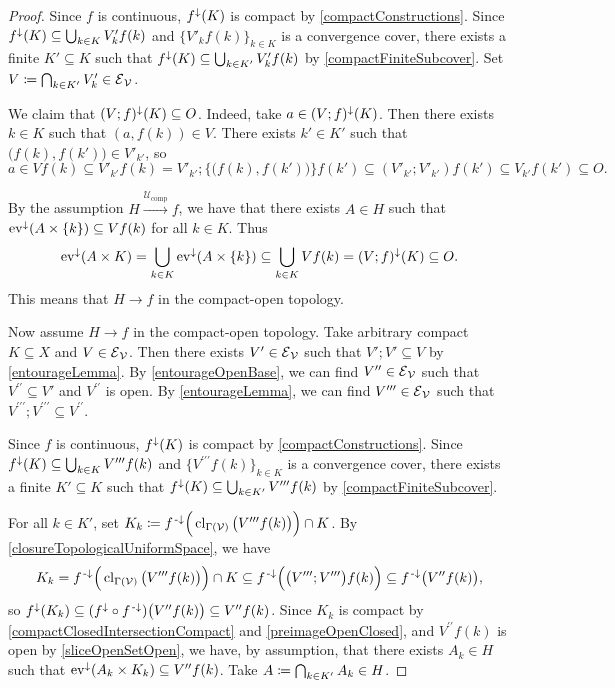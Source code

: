 \begin{proof}
Since $f$ is continuous, $f^\downarrow(K)$ is compact by \ref{compactConstructions}. Since $f^\downarrow(K) \subseteq \bigcup_{k\in K}V'_kf(k)$ and $\{V'_kf(k)\}_{k\in K}$ is a convergence cover, there exists a finite $K'\subseteq K$ such that $f^\downarrow(K)\subseteq \bigcup_{k\in K'}V'_kf(k)$ by \ref{compactFiniteSubcover}. Set $V\coloneqq \bigcap_{k\in K'}V'_k \in \operatorname{\mathcal{E}}_{\mathcal{V}}$.

We claim that $(V;f)^\downarrow(K) \subseteq O$. Indeed, take $a\in (V;f)^\downarrow(K)$. Then there exists $k\in K$ such that $(a, f(k))\in V$. There exists $k'\in K'$ such that $\big(f(k), f(k')\big)\in V'_{k'}$, so
\[ a \in Vf(k) \subseteq V'_{k'}f(k) = V'_{k'};\{\big(f(k), f(k')\big)\}f(k') \subseteq (V'_{k'};V'_{k'})f(k') \subseteq V_{k'}f(k')\subseteq O. \]

By the assumption $H \overset{\mathcal{U}_\text{comp}}{\longrightarrow} f$, we have that there exists $A\in H$ such that $\operatorname{ev}^\downarrow(A\times \{k\}) \subseteq Vf(k)$ for all $k\in K$. Thus
\[ \operatorname{ev}^\downarrow(A\times K) = \bigcup_{k\in K}\operatorname{ev}^\downarrow(A\times \{k\}) \subseteq \bigcup_{k\in K}Vf(k) = (V;f)^\downarrow(K) \subseteq O. \]
This means that $H\to f$ in the compact-open topology.

Now assume $H\to f$ in the compact-open topology. Take arbitrary compact $K\subseteq X$ and $V\in \operatorname{\mathcal{E}}_{\mathcal{V}}$. Then there exists $V'\in \operatorname{\mathcal{E}}_{\mathcal{V}}$ such that $V';V' \subseteq V$ by \ref{entourageLemma}. By \ref{entourageOpenBase}, we can find $V^{\prime\prime} \in \operatorname{\mathcal{E}}_\mathcal{V}$ such that $V^{\prime\prime} \subseteq V'$ and $V^{\prime\prime}$ is open. By \ref{entourageLemma}, we can find $V^{\prime\prime\prime} \in \operatorname{\mathcal{E}}_\mathcal{V}$ such that $V^{\prime\prime\prime};V^{\prime\prime\prime} \subseteq V^{\prime\prime}$.

Since $f$ is continuous, $f^\downarrow(K)$ is compact by \ref{compactConstructions}. Since $f^\downarrow(K) \subseteq \bigcup_{k\in K}V^{\prime\prime\prime}f(k)$ and $\{V^{\prime\prime\prime}f(k)\}_{k\in K}$ is a convergence cover, there exists a finite $K'\subseteq K$ such that $f^\downarrow(K)\subseteq \bigcup_{k\in K'}V^{\prime\prime\prime}f(k)$ by \ref{compactFiniteSubcover}.

For all $k\in K'$, set $K_k \coloneqq f^{\text{\hspace{0.15em}-}\downarrow}\Big(\operatorname{cl}_{\Gamma(\mathcal{V})}\big(V^{\prime\prime\prime}f(k)\big)\Big)\cap K$. By \ref{closureTopologicalUniformSpace}, we have
\[ K_k = f^{\text{\hspace{0.15em}-}\downarrow}\Big(\operatorname{cl}_{\Gamma(\mathcal{V})}\big(V^{\prime\prime\prime}f(k)\big)\Big)\cap K \subseteq f^{\text{\hspace{0.15em}-}\downarrow}\Big(\big(V^{\prime\prime\prime};V^{\prime\prime\prime}\big)f(k)\Big) \subseteq f^{\text{\hspace{0.15em}-}\downarrow}\big(V^{\prime\prime}f(k)\big),  \]
so $f^\downarrow(K_k) \subseteq (f^\downarrow\circ f^{\text{\hspace{0.15em}-}\downarrow})\big(V^{\prime\prime}f(k)\big) \subseteq V^{\prime\prime}f(k)$. Since $K_k$ is compact by \ref{compactClosedIntersectionCompact} and \ref{preimageOpenClosed}, and $V^{\prime\prime}f(k)$ is open by \ref{sliceOpenSetOpen}, we have, by assumption, that there exists $A_k\in H$ such that $\operatorname{ev}^\downarrow(A_k\times K_k)\subseteq V^{\prime\prime}f(k)$. Take $A \coloneqq \bigcap_{k\in K'}A_k \in H$.


\end{proof}
